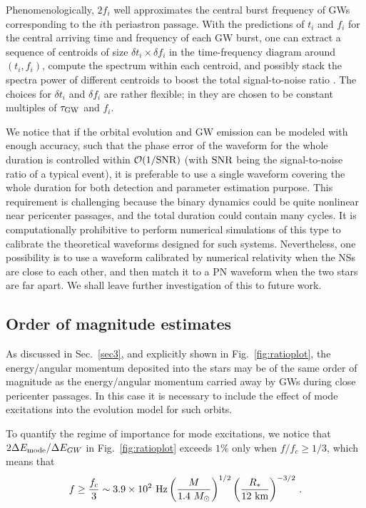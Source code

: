 \documentclass[prd,aps,floatfix,superscriptaddress,nofootinbib,twocolumn,10pt,English]{revtex4}
\begin{document}
Phenomenologically, $2 f_i$ well approximates the central
burst frequency of GWs corresponding to the $i$th periastron passage. With the
predictions of $t_i$ and $f_i$ for the central arriving time and frequency of each
GW burst, one can extract a sequence of centroids of size $\delta t_i \times
\delta f_i$ in the time-frequency diagram around $(t_i, f_i)$, compute the
spectrum within each centroid, and possibly stack the spectra power of
different centroids to boost the total signal-to-noise ratio
\cite{East:2012xq,huerta2014accurate}.  The choices for $\delta t_i$ and $\delta f_i$ are
rather flexible; in \cite{loutrel2017eccentric} they are chosen to be
constant multiples of $\tau_{\rm GW}$ and $f_i$.

We notice that if the orbital evolution and GW emission can be modeled with
enough accuracy, such that the phase error of the waveform for the whole
duration is controlled within $\mathcal{O}(1/{\rm SNR})$ (with ${\rm SNR}$
being the signal-to-noise ratio of a typical event), it is preferable to use a
single waveform covering the whole duration for both detection and parameter
estimation purpose. This requirement is challenging because the binary dynamics
could be quite nonlinear near pericenter passages, and the total duration
could contain many cycles. It is computationally prohibitive to perform
numerical simulations of this type to calibrate the theoretical waveforms
designed for such systems.  Nevertheless, one possibility is to use  a waveform
calibrated by numerical relativity when the NSs are close to each other, and then
match it to a PN waveform when the two stars are far apart.  We shall leave
further investigation of this to future work.

\subsection{Order of magnitude estimates}

As discussed in Sec.~\ref{sec3}, and explicitly shown in
Fig.~\ref{fig:ratioplot}, the energy/angular momentum deposited into the stars
may be of the same order of magnitude as the energy/angular momentum carried
away by GWs during close pericenter passages. In this case it is necessary to
include the effect of mode excitations into the evolution model for such
orbits.

To quantify the regime of importance for mode excitations, we notice that $2
\Delta E_{\rm mode}/\Delta E_{GW}$ in Fig.~\ref{fig:ratioplot} exceeds $1\%$
only when $f/f_c \ge 1/3$, which means that 
\begin{align} 
    f \ge \frac{f_c}{3} \sim
    3.9\times 10^{2} {\rm \ Hz} \left ( \frac{M}{1.4\ M_\odot}\right )^{1/2} \left
    ( \frac{R_*}{12 {\rm \ km}}\right )^{-3/2}\,.  
\end{align} 
\end{document}
